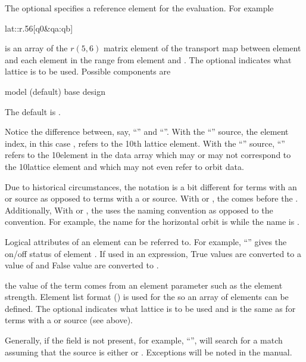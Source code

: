 The optional  specifies a reference
element for the evaluation. For example
\begin{example}
  lat::r.56[q0\&qa:qb]
\end{example}  
is an array of the $r(5,6)$ matrix element of the transport map
between element  and each element in the range from element
 and . The optional  indicates what
lattice is to be used. Possible components are
\begin{example}
  model (default)
  base
  design
\end{example}
The default is .

Notice the difference between, say, ``'' and
``''. With the ``'' source, the element 
index, in this case , refers to the 10th lattice element. With the
``'' source, ``'' refers to the 10\Th element in
the  data array which may or may not correspond to the
10\Th lattice element and which may not even refer to orbit data.

Due to historical circumstances, the notation is a bit different for
terms with an  or  source as opposed to terms with
a  or  source. With  or , the
 comes before the . Additionally,
With  or , the  uses the \bmad
naming convention as opposed to the \tao convention. For example, the
\tao name for the horizontal orbit is  while the \bmad
name is .

Logical attributes of an element can be referred to. For example,
``'' gives the on/off status of element
. If used in an expression, True values are converted to a
value of  and False value are converted to .

the value of the term comes from an element parameter such as the
element strength.  Element list format () is
used for the  so an array of elements can be
defined.  The optional  indicates what lattice is to
be used and is the same as for terms with a  or 
source (see above).

Generally, if the  field is not present, for example, 
``'', \tao will search 
for a match assuming that the source is either  or . 
Exceptions will be noted in the manual.


